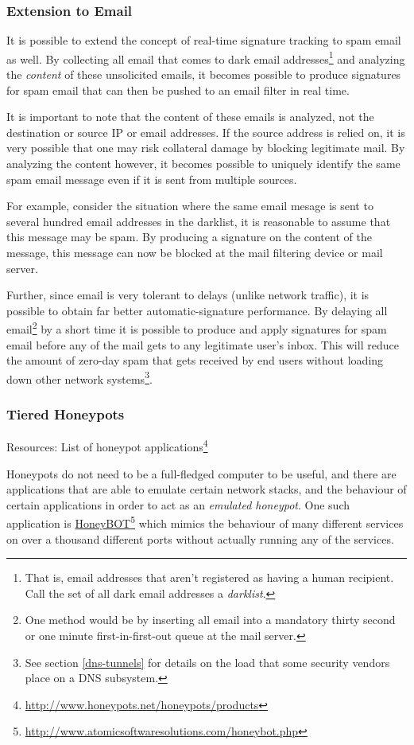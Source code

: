 \documentclass{article}
\newcommand{\hreff}[2]{\href{#1}{#2}\footnote{\url{#1}}}
\theoremstyle{remark}
\theoremstyle{definition}
\theoremstyle{definition}
\theoremstyle{definition}
\begin{document}
\subsubsection{Extension to Email}
It is possible to extend the concept of real-time signature tracking to spam email as well. By collecting all email that comes to dark email addresses\footnote{That is, email addresses that aren't registered as having a human recipient. Call the set of all dark email addresses a \emph{darklist}.} and analyzing the \emph{content} of these unsolicited emails, it becomes possible to produce signatures for spam email that can then be pushed to an email filter in real time.

It is important to note that the content of these emails is analyzed, not the destination or source IP or email addresses. If the source address is relied on, it is very possible that one may risk collateral damage by blocking legitimate mail. By analyzing the content however, it becomes possible to uniquely identify the same spam email message even if it is sent from multiple sources.

For example, consider the situation where the same email mesage is sent to several hundred email addresses in the darklist, it is reasonable to assume that this message may be spam. By producing a signature on the content of the message, this message can now be blocked at the mail filtering device or mail server.

Further, since email is very tolerant to delays (unlike network traffic), it is possible to obtain far better automatic-signature performance. By delaying all email\footnote{One method would be by inserting all email into a mandatory thirty second or one minute first-in-first-out queue at the mail server.} by a short time it is possible to produce and apply signatures for spam email before any of the mail gets to any legitimate user's inbox. This will reduce the amount of zero-day spam that gets received by end users without loading down other network systems\footnote{See section \ref{dns-tunnels} for details on the load that some security vendors place on a DNS subsystem.}.

\subsubsection{Tiered Honeypots}
Resources: List of honeypot applications\footnote{\url{http://www.honeypots.net/honeypots/products}}

Honeypots do not need to be a full-fledged computer to be useful, and there are applications that are able to emulate certain network stacks, and the behaviour of certain applications in order to act as an \emph{emulated honeypot}. One such application is \hreff{http://www.atomicsoftwaresolutions.com/honeybot.php}{HoneyBOT} which mimics the behaviour of many different services on over a thousand different ports without actually running any of the services.
\end{document}

